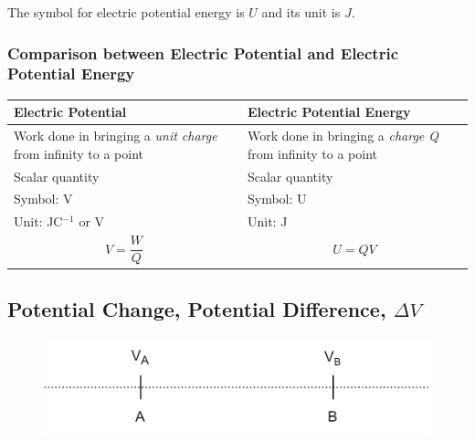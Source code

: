 \documentclass[../../../main.tex]{subfiles}
\begin{document}
The symbol for electric potential energy is \(U\) and its unit is \(J\).

\subsubsection{Comparison between Electric Potential and Electric Potential Energy}

\begin{table}[h]
    \centering
    \begin{tabularx}{\linewidth}{|X|X|}
        \hline
        \textbf{Electric Potential}                                         & \textbf{Electric Potential Energy}                               \\
        \hline
        Work done in bringing a \emph{unit charge} from infinity to a point & Work done in bringing a \emph{charge Q} from infinity to a point \\
        \hline
        Scalar quantity                                                     & Scalar quantity                                                  \\
        \hline
        Symbol: V                                                           & Symbol: U                                                        \\
        \hline
        Unit: JC\(^{-1}\) or V                                              & Unit: J                                                          \\
        \hline
        \[V=\frac{W}{Q}\]                                                   & \[U=QV\]                                                         \\
        \hline
    \end{tabularx}
\end{table}

\pagebreak

\subsection{Potential Change, Potential Difference, \(\Delta V\)}

\begin{figure}[h]
    \centering
    \includegraphics[scale=0.3]{figures/10.png}
\end{figure}
\end{document}
